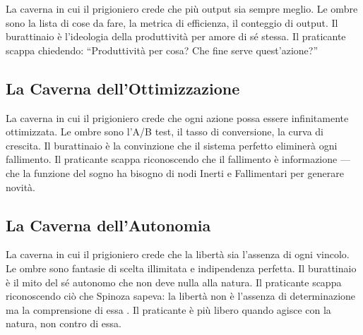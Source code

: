 La caverna in cui il prigioniero crede che pi\`u output sia sempre
meglio. Le ombre sono la lista di cose da fare, la metrica di
efficienza, il conteggio di output. Il burattinaio \`e l'ideologia
della produttivit\`a per amore di s\'e stessa. Il praticante scappa
chiedendo: ``Produttivit\`a per cosa? Che fine serve quest'azione?''

\subsection{La Caverna dell'Ottimizzazione}

La caverna in cui il prigioniero crede che ogni azione possa essere
infinitamente ottimizzata. Le ombre sono l'A/B test, il tasso di
conversione, la curva di crescita. Il burattinaio \`e la convinzione
che il sistema perfetto eliminer\`a ogni fallimento. Il praticante
scappa riconoscendo che il fallimento \`e informazione --- che la
funzione del sogno ha bisogno di nodi Inerti e Fallimentari per generare
novit\`a.

\subsection{La Caverna dell'Autonomia}

La caverna in cui il prigioniero crede che la libert\`a sia l'assenza
di ogni vincolo. Le ombre sono fantasie di scelta illimitata e
indipendenza perfetta. Il burattinaio \`e il mito del s\'e autonomo
che non deve nulla alla natura. Il praticante scappa riconoscendo ci\`o
che Spinoza sapeva: la libert\`a non \`e l'assenza di determinazione
ma la comprensione di essa \parencite[V.P42]{spinoza1994ethics}. Il
praticante \`e pi\`u libero quando agisce con la natura, non contro
di essa.

